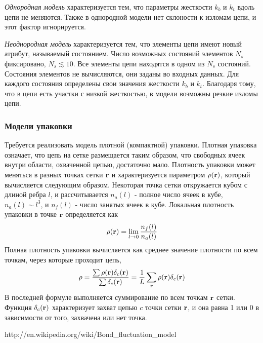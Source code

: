 \documentclass[tikz,a4paper]{scrartcl} %
\begin{document}
\textit{Однородная модель} характеризуется тем, что параметры жесткости $k_b$ и $k_t$ вдоль цепи не меняются. Также в однородной модели нет склоности к изломам цепи, и этот фактор игнорируется.

\textit{Неоднородная модель} характеризуется тем, что элементы цепи имеют новый атрибут, называемый состоянием. Число возможных состояний элементов $N_s$ фиксировано, $N_s \lesssim 10$. Все элементы цепи находятся в одном из $N_s$ состояний. Состояния элементов не вычисляются, они заданы во входных данных. Для каждого состояния определены свои значения жесткости $k_b$ и $k_t$. Благодаря тому, что в цепи есть участки с низкой жесткостью, в модели возможны резкие изломы цепи.

\subsubsection*{Модели упаковки}
Требуется реализовать модель плотной (компактной) упаковки. Плотная упаковка означает, что цепь на сетке размещается таким образом, что свободных ячеек внутри области, охваченной цепью, достаточно мало. Плотность упаковки может меняться в разных точках сетки $\bold r$ и характеризуется параметром $\rho(\bold r)$, который вычисляется следующим образом. Некоторая точка сетки откружается кубом с длиной ребра $l$, и рассчитывается $n_a(l)$ - полное число ячеек в кубе, $n_a(l) \sim l^3$, и $n_f(l)$ - число занятых ячеек в кубе. Локальная плотность упаковки в точке $\bold r$ определяется как 
\[\rho(\bold r) = \lim_{l\rightarrow 0} \frac{n_f(l)}{n_a(l)} \]
Полная плотность упаковки вычисляется как среднее значение плотности по всем точкам, через которые проходит цепь, 
\[\rho = \frac{\sum \rho(\bold r)\delta_c(\bold r)}{\sum \delta_c(\bold r)} = \frac{1}{L} \sum_{\bold r} \rho(\bold r)\delta_c(\bold r) \]
В последней формуле выполняется суммирование по всем точкам $\bold r$ сетки.  Функция $\delta_c(\bold r)$ характеризует захват цепью $c$ точки сетки $\bold r$, и она равна 1 или 0 в зависимости от того, захвачена или нет точка. 

 
\begin{thebibliography}{99}
 http://en.wikipedia.org/wiki/Bond\_fluctuation\_model
\end{thebibliography}
\end{document}
